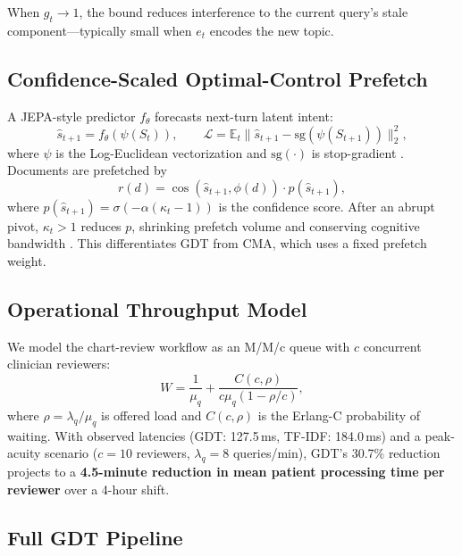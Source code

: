 \documentclass[journal,10pt,twoside]{IEEEtran}
\begin{document}
When $g_t{\to}1$, the bound reduces interference to the current query's stale component---typically small when $e_t$ encodes the new topic.

\subsection{Confidence-Scaled Optimal-Control Prefetch}

A JEPA-style predictor $f_\theta$ forecasts next-turn latent intent:
\begin{equation}
  \hat{s}_{t+1} = f_\theta(\psi(S_t)), \qquad
  \mathcal{L} = \mathbb{E}_t\|\hat{s}_{t+1} - \mathrm{sg}(\psi(S_{t+1}))\|_2^2,
  \label{eq:jepa}
\end{equation}
where $\psi$ is the Log-Euclidean vectorization and $\mathrm{sg}(\cdot)$ is stop-gradient \cite{grill20}. Documents are prefetched by
\begin{equation}
  r(d) = \cos(\hat{s}_{t+1}, \phi(d)) \cdot p(\hat{s}_{t+1}),
  \label{eq:prefetch}
\end{equation}
where $p(\hat{s}_{t+1}) = \sigma(-\alpha(\kappa_t{-}1))$ is the confidence score. After an abrupt pivot, $\kappa_t{>}1$ reduces $p$, shrinking prefetch volume and conserving cognitive bandwidth \cite{sweller1988_cogl}. This differentiates GDT from CMA, which uses a fixed prefetch weight.

\subsection{Operational Throughput Model}
\label{sec:queueing}

We model the chart-review workflow as an M/M/c queue \cite{kleinrock1975,gross2008} with $c$ concurrent clinician reviewers:
\begin{equation}
  W = \frac{1}{\mu_q} + \frac{C(c,\rho)}{c\mu_q(1-\rho/c)},
  \label{eq:waiting_time}
\end{equation}
where $\rho{=}\lambda_q/\mu_q$ is offered load and $C(c,\rho)$ is the Erlang-C probability of waiting. With observed latencies (GDT: 127.5\,ms, TF-IDF: 184.0\,ms) and a peak-acuity scenario ($c{=}10$ reviewers, $\lambda_q{=}8$ queries/min), GDT's 30.7\% reduction projects to a \textbf{4.5-minute reduction in mean patient processing time per reviewer} over a 4-hour shift.

\subsection{Full GDT Pipeline}
\end{document}
